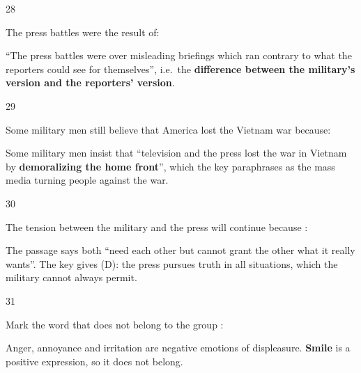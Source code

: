 \begin{question}{28}
{The press battles were the result of:\par}
\begin{explain}
``The press battles were over misleading briefings which ran contrary to what the reporters could see for themselves'', i.e.\ the \textbf{difference between the military's version and the reporters' version}.
\end{explain}
\end{question}

\begin{question}{29}
{Some military men still believe that America lost the Vietnam war because:\par}
\begin{explain}
Some military men insist that ``television and the press lost the war in Vietnam by \textbf{demoralizing the home front}'', which the key paraphrases as the mass media turning people against the war.
\end{explain}
\end{question}

\begin{question}{30}
{The tension between the military and the press will continue because :\par}
\begin{explain}
The passage says both ``need each other but cannot grant the other what it really wants''. The key gives (D): the press pursues truth in all situations, which the military cannot always permit.
\end{explain}
\end{question}

\begin{question}{31}
{Mark the word that does not belong to the group :\par}
\begin{explain}
Anger, annoyance and irritation are negative emotions of displeasure. \textbf{Smile} is a positive expression, so it does not belong.
\end{explain}
\end{question}

